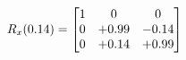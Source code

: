 \documentclass[preview]{standalone}
\begin{document}
\begin{align*}
\special{dvisvgm:raw <g id='unique000'>}R_{x}(0.14) = \begin{bmatrix}1 & 0 & 0 \\0 & +0.99 & -0.14 \\0 & +0.14 & +0.99\end{bmatrix}\special{dvisvgm:raw </g>}
\end{align*}
\end{document}
